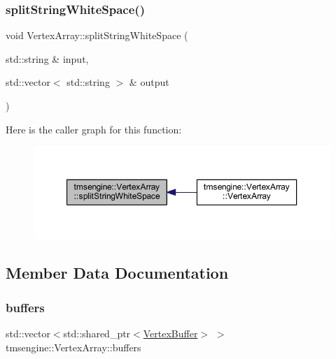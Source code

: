\subsubsection{\texorpdfstring{split\+String\+White\+Space()}{splitStringWhiteSpace()}}
{\footnotesize\ttfamily void Vertex\+Array\+::split\+String\+White\+Space (\begin{DoxyParamCaption}\item[{std\+::string \&}]{input,  }\item[{std\+::vector$<$ std\+::string $>$ \&}]{output }\end{DoxyParamCaption})\hspace{0.3cm}{\ttfamily [private]}}

Here is the caller graph for this function\+:\nopagebreak
\begin{figure}[H]
\begin{center}
\leavevmode
\includegraphics[width=350pt]{classtmsengine_1_1_vertex_array_a35f3a952fe7089d2ebe71c6d4e2c2443_icgraph}
\end{center}
\end{figure}


\subsection{Member Data Documentation}
\mbox{\label{classtmsengine_1_1_vertex_array_a39afaa4b9e37f5a8e107e82cab67e354}} 
\subsubsection{\texorpdfstring{buffers}{buffers}}
{\footnotesize\ttfamily std\+::vector$<$std\+::shared\+\_\+ptr$<$\hyperlink{classtmsengine_1_1_vertex_buffer}{Vertex\+Buffer}$>$ $>$ tmsengine\+::\+Vertex\+Array\+::buffers\hspace{0.3cm}{\ttfamily [private]}}

